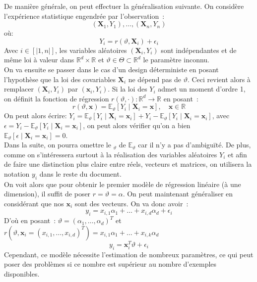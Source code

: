 \documentclass[12pt]{article}
\begin{document}
\noindent De manière générale, on peut effectuer la généralisation suivante. On considère l'expérience statistique engendrée par l'observation~:
$$
(\textbf{X}_1, Y_1), \ldots, (\textbf{X}_n, Y_n)
$$
où:
$$
Y_i = r(\vartheta, \textbf{X}_i) + \epsilon_i
$$
Avec $i \in [|1, n|]$, les variables aléatoires $(\textbf{X}_i, Y_i)$ sont indépendantes et de même loi à valeur dans $\mathbb{R}^d \times \mathbb{R}$ et $\vartheta \in \Theta \subset \mathbb{R}^d$ le paramètre inconnu.\\
On va ensuite se passer dans le cas d'un design déterministe en posant l'hypothèse que la loi des covariables $\textbf{X}_i$ ne dépend pas de $\vartheta$. Ceci revient alors à remplacer $(\textbf{X}_i, Y_i)$ par $(\textbf{x}_i, Y_i)$. 
Si la loi des $Y_i$ admet un moment d'ordre 1, on définit la fonction de régression $r(\vartheta, \cdot): \mathbb{R}^d \rightarrow \mathbb{R}$ en posant~:
$$
r(\vartheta, \textbf{x}) = \mathbb{E}_{\vartheta}[Y_i \mid \textbf{X}_i = \textbf{x}], \quad \textbf{x} \in \mathbb{R}
$$
On peut alors écrire: $Y_i = \mathbb{E}_{\vartheta}[Y_i \mid \textbf{X}_i = \textbf{x}_i] + Y_i - \mathbb{E}_{\vartheta}[Y_i \mid \textbf{X}_i = \textbf{x}_i]$, avec $\epsilon = Y_i - \mathbb{E}_{\vartheta}[Y_i \mid \textbf{X}_i =\textbf{x}_i]$, on peut alors vérifier qu'on a bien $\mathbb{E}_{\vartheta}[\epsilon \mid \textbf{X}_i =\textbf{x}_i] = 0$.\\
Dans la suite, on pourra omettre le $_{\vartheta}$ de $\mathbb{E}_{\vartheta}$ car il n'y a pas d'ambiguïté. De plus, comme on s'intéressera surtout à la réalisation des variables aléatoires $Y_i$ et afin de faire une distinction plus claire entre réels, vecteurs et matrices, on utilisera la notation $y_i$ dans le reste du document.\\

On voit alors que pour obtenir le premier modèle de régression linéaire (à une dimension), il suffit de poser $r = \vartheta = \alpha$. On peut maintenant généraliser en considérant que nos $\textbf{x}_i$ sont des vecteurs. On va donc avoir~:
$$
y_i = x_{i, 1}\alpha_1 + \ldots + x_{i, d}\alpha_d + \epsilon_i
$$
D'où en posant~: $\vartheta = (\alpha_1, \ldots, \alpha_d)^T$ et $r(\vartheta, \textbf{x}_i = (x_{i, 1}, \ldots, x_{i, d})^T) = x_{i, 1}\alpha_1 + \ldots + x_{i, k}\alpha_d$
$$
y_i  = \textbf{x}^T_i\vartheta + \epsilon_i
$$
Cependant, ce modèle nécessite l'estimation de nombreux paramètres, ce qui peut poser des problèmes si ce nombre est supérieur au nombre d'exemples disponibles.
\end{document}
